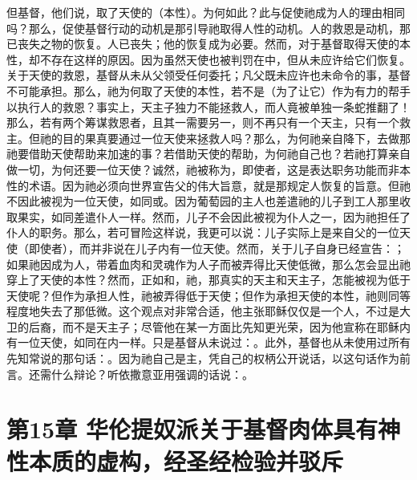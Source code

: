 但基督，他们说，取了天使的（本性）。为何如此？此与促使祂成为人的理由相同吗？那么，促使基督行动的动机是那引导祂取得人性的动机。人的救恩是动机，那已丧失之物的恢复。人已丧失；他的恢复成为必要。然而，对于基督取得天使的本性，却不存在这样的原因。因为虽然天使也被判罚在中，但从未应许给它们恢复。关于天使的救恩，基督从未从父领受任何委托；凡父既未应许也未命令的事，基督不可能承担。那么，祂为何取了天使的本性，若不是（为了让它）作为有力的帮手以执行人的救恩？事实上，天主子独力不能拯救人，而人竟被单独一条蛇推翻了！那么，若有两个筹谋救恩者，且其一需要另一，则不再只有一个天主，只有一个救主。但祂的目的果真要通过一位天使来拯救人吗？那么，为何祂亲自降下，去做那祂要借助天使帮助来加速的事？若借助天使的帮助，为何祂自己也？若祂打算亲自做一切，为何还要一位天使？诚然，祂被称为，即使者，这是表达职务功能而非本性的术语。因为祂必须向世界宣告父的伟大旨意，就是那规定人恢复的旨意。但祂不因此被视为一位天使，如同或。因为葡萄园的主人也差遣祂的儿子到工人那里收取果实，如同差遣仆人一样。然而，儿子不会因此被视为仆人之一，因为祂担任了仆人的职务。那么，若可冒险这样说，我更可以说：儿子实际上是来自父的一位天使（即使者），而并非说在儿子内有一位天使。然而，关于儿子自身已经宣告：；如果祂因成为人，带着血肉和灵魂作为人子而被弄得比天使低微，那么怎会显出祂穿上了天使的本性？然而，正如和，祂，那真实的天主和天主子，怎能被视为低于天使呢？但作为承担人性，祂被弄得低于天使；但作为承担天使的本性，祂则同等程度地失去了那低微。这个观点对非常合适，他主张耶稣仅仅是一个人，不过是大卫的后裔，而不是天主子；尽管他在某一方面比先知更光荣，因为他宣称在耶稣内有一位天使，如同在内一样。只是基督从未说过：。此外，基督也从未使用过所有先知常说的那句话：。因为祂自己是主，凭自己的权柄公开说话，以这句话作为前言。还需什么辩论？听依撒意亚用强调的话说：。\par


\section{第15章 华伦提奴派关于基督肉体具有神性本质的虚构，经圣经检验并驳斥}

